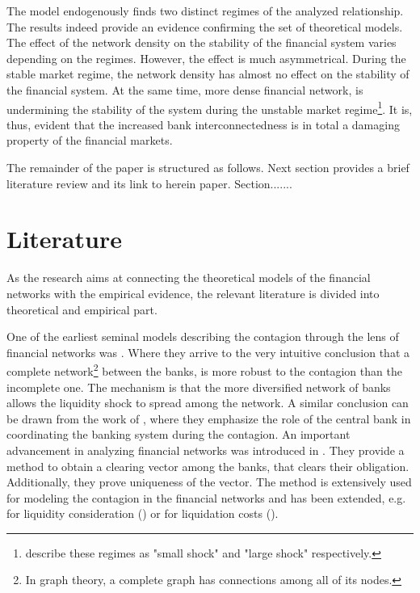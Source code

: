 \documentclass[12pt]{article}
\begin{document}
The model endogenously finds two distinct regimes of the analyzed relationship. The results indeed provide an evidence confirming the set of theoretical models. The effect of the network density on the stability of the financial system varies depending on the regimes. However, the effect is much asymmetrical. During the stable market regime, the network density has almost no effect on the stability of the financial system. At the same time, more dense financial network, is undermining the stability of the system during the unstable market regime\footnote{\cite{acemoglu13} describe these regimes as "small shock" and "large shock" respectively.}. It is, thus, evident that the increased bank interconnectedness is in total a damaging property of the financial markets. 

The remainder of the paper is structured as follows. Next section provides a brief literature review and its link to herein paper. Section.......

\section{Literature}\label{section:literature}

As the research aims at connecting the theoretical models of the financial networks with the empirical evidence, the relevant literature is divided into theoretical and empirical part.

One of the earliest seminal models describing the contagion through the lens of financial networks was \cite{allen00}. Where they arrive to the very intuitive conclusion that a complete network\footnote{In graph theory, a complete graph has connections among all of its nodes.} between the banks, is more robust to the contagion than the incomplete one. The mechanism is that the more diversified network of banks allows the liquidity shock to spread among the network. A similar conclusion can be drawn from the work of \cite{freixas00}, where they emphasize the role of the central bank in coordinating the banking system during the contagion. An important advancement in analyzing financial networks was introduced in \cite{eisenberg01}. They provide a method to obtain a clearing vector among the banks, that clears their obligation. Additionally, they prove uniqueness of the vector. The method is extensively used for modeling the contagion in the financial networks and has been extended, e.g. for liquidity consideration (\cite{cifuentes05}) or for liquidation costs (\cite{rogers13}). 
\end{document}
